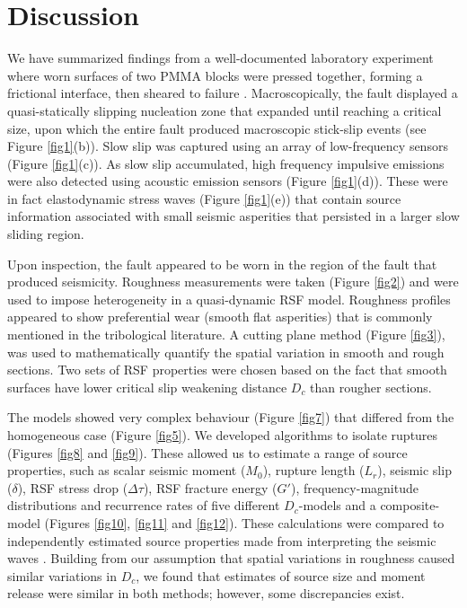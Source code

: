 \documentclass[draft]{agujournal2019}
\begin{document}
\section{Discussion}
We have summarized findings from a well-documented laboratory experiment where worn surfaces of two PMMA blocks were pressed together, forming a frictional interface, then sheared to failure \cite{Selvadurai2015, Selvadurai2015a, Selvadurai2017}. Macroscopically, the fault displayed a quasi-statically slipping nucleation zone that expanded until reaching a critical size, upon which the entire fault produced macroscopic stick-slip events (see Figure \ref{fig1}(b)).  Slow slip was captured using an array of low-frequency sensors (Figure \ref{fig1}(c)). As slow slip accumulated, high frequency impulsive emissions were also detected using acoustic emission sensors (Figure \ref{fig1}(d)).  These were in fact elastodynamic stress waves (Figure \ref{fig1}(e)) that contain source information associated with small seismic asperities that persisted in a larger slow sliding region.  

Upon inspection, the fault appeared to be worn in the region of the fault that produced seismicity. Roughness measurements were taken (Figure \ref{fig2}) and were used to impose heterogeneity in a quasi-dynamic RSF model. Roughness profiles appeared to show preferential wear (smooth flat asperities) that is commonly mentioned in the tribological literature. A cutting plane method (Figure \ref{fig3}), was used to mathematically quantify the spatial variation in smooth and rough sections. Two sets of RSF properties were chosen based on the fact that smooth surfaces have lower critical slip weakening distance $D_{c}$ than rougher sections.  

The models showed very complex behaviour (Figure \ref{fig7}) that differed from the homogeneous case (Figure \ref{fig5}).  We developed algorithms to isolate ruptures (Figures \ref{fig8} and \ref{fig9}).  These allowed us to estimate a range of source properties, such as scalar seismic moment ($M_{0}$), rupture length ($L_{r}$), seismic slip ($\delta$), RSF stress drop ($\Delta\tau$), RSF fracture energy ($G'$), frequency-magnitude distributions and recurrence rates of five different $D_{c}$-models and a composite-model (Figures \ref{fig10}, \ref{fig11} and \ref{fig12}). These calculations were compared to independently estimated source properties made from interpreting the seismic waves \cite{Selvadurai2019}.  Building from our assumption that spatial variations in roughness caused similar variations in $D_{c}$, we found that estimates of source size and moment release were similar in both methods; however, some discrepancies exist. 
\end{document}
